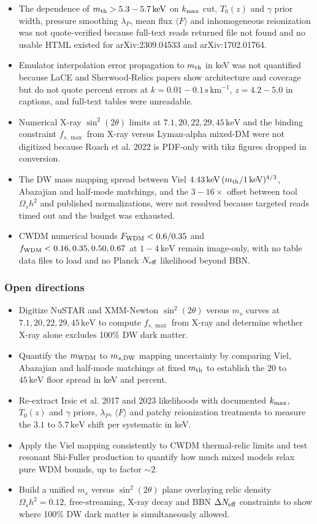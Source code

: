\documentclass[11pt,a4paper]{article}
\begin{document}
\begin{itemize}
  \item The dependence of $m_{\rm th} > 5.3-5.7\,\mathrm{keV}$ on $k_{\rm max}$ cut, $T_0(z)$ and $\gamma$ prior width, pressure smoothing $\lambda_P$, mean flux $\langle F \rangle$ and inhomogeneous reionization was not quote-verified because full-text reads returned file not found and no usable HTML existed for arXiv:2309.04533 and arXiv:1702.01764.
  \item Emulator interpolation error propagation to $m_{\rm th}$ in keV was not quantified because LaCE and Sherwood-Relics papers show architecture and coverage but do not quote percent errors at $k = 0.01-0.1\,\mathrm{s\,km^{-1}}$, $z = 4.2-5.0$ in captions, and full-text tables were unreadable.
  \item Numerical X-ray $\sin^2(2\theta)$ limits at $7.1, 20, 22, 29, 45\,\mathrm{keV}$ and the binding constraint $f_{s,\max}$ from X-ray versus Lyman-alpha mixed-DM were not digitized because Roach et al. 2022 is PDF-only with tikz figures dropped in conversion.
  \item The DW mass mapping spread between Viel $4.43\,\mathrm{keV}\,(m_{\rm th}/1\,\mathrm{keV})^{4/3}$, Abazajian and half-mode matchings, and the $3-16\times$ offset between tool $\Omega_s h^2$ and published normalizations, were not resolved because targeted reads timed out and the budget was exhausted.
  \item CWDM numerical bounds $F_{\rm WDM} < 0.6/0.35$ and $f_{\rm WDM} < 0.16, 0.35, 0.50, 0.67$ at $1-4\,\mathrm{keV}$ remain image-only, with no table data files to load and no Planck $N_{\rm eff}$ likelihood beyond BBN.
\end{itemize}
\subsubsection*{Open directions}
\begin{itemize}
  \item Digitize NuSTAR and XMM-Newton $\sin^2(2\theta)$ versus $m_s$ curves at $7.1, 20, 22, 29, 45\,\mathrm{keV}$ to compute $f_{s,\max}$ from X-ray and determine whether X-ray alone excludes 100\% DW dark matter.
  \item Quantify the $m_{\rm WDM}$ to $m_{s,{\rm DW}}$ mapping uncertainty by comparing Viel, Abazajian and half-mode matchings at fixed $m_{\rm th}$ to establish the $20$ to $45\,\mathrm{keV}$ floor spread in keV and percent.
  \item Re-extract Irsic et al. 2017 and 2023 likelihoods with documented $k_{\rm max}$, $T_0(z)$ and $\gamma$ priors, $\lambda_P$, $\langle F \rangle$ and patchy reionization treatments to measure the $3.1$ to $5.7\,\mathrm{keV}$ shift per systematic in keV.
  \item Apply the Viel mapping consistently to CWDM thermal-relic limits and test resonant Shi-Fuller production to quantify how much mixed models relax pure WDM bounds, up to factor $\sim 2$.
  \item Build a unified $m_s$ versus $\sin^2(2\theta)$ plane overlaying relic density $\Omega_s h^2 = 0.12$, free-streaming, X-ray decay and BBN $\Delta N_{\rm eff}$ constraints to show where 100\% DW dark matter is simultaneously allowed.
\end{itemize}
\end{document}
